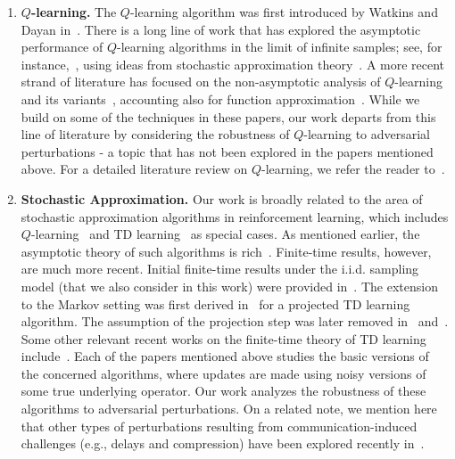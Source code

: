 \documentclass{article}
\begin{document}
\begin{enumerate}
\item \textbf{\(Q\)-learning.} The \(Q\)-learning algorithm was first introduced by Watkins and Dayan in~\citet{watkins1992q}. There is a long line of work that has explored the asymptotic performance of \(Q\)-learning algorithms in the limit of infinite samples; see, for instance,~\citet{borkar, tsitsiklis94, jaakkola}, using ideas from stochastic approximation theory~\cite{borkar, borkarode}. A more recent strand of literature has focused on the non-asymptotic analysis of \(Q\)-learning and its variants~\cite{shah2018, Waiwright, Qu, li2024q}, accounting also for function approximation~\cite{chenQ}. While we build on some of the techniques in these papers, our work departs from this line of literature by considering the robustness of \(Q\)-learning to adversarial perturbations - a topic that has not been explored in the papers mentioned above. For a detailed literature review on \(Q\)-learning, we refer the reader to~\citet{li2024q}. 

\item \textbf{Stochastic Approximation.} Our work is broadly related to the area of stochastic approximation algorithms in reinforcement learning, which includes \(Q\)-learning~\cite{watkins1992q} and TD learning~\cite{sutton1988} as special cases. As mentioned earlier, the asymptotic theory of such algorithms is rich~\cite{tsitsiklisroy}. Finite-time results, however, are much more recent. Initial finite-time results under the i.i.d. sampling model (that we also consider in this work) were provided in~\citet{korda,  lakshmi, dalal, narayanan, prashanth2021conc}. The extension to the Markov setting was first derived in~\cite{bhandari_finite} for a projected TD learning algorithm. The assumption of the projection step was later removed in~\citet{srikant} and~\citet{mitra2024simple}. Some other relevant recent works on the finite-time theory of TD learning include~\cite{liu, patil2023, khamaru, xie2025finite, lee2025finite}. Each of the papers mentioned above studies the basic versions of the concerned algorithms, where updates are made using noisy versions of some true underlying operator. Our work analyzes the robustness of these algorithms to adversarial perturbations. On a related note, we mention here that other types of perturbations resulting from communication-induced challenges (e.g., delays and compression) have been explored recently in~\cite{mitra2023temporal, adibi2024stochastic, dal2024finite}. 


\end{enumerate}
\end{document}

